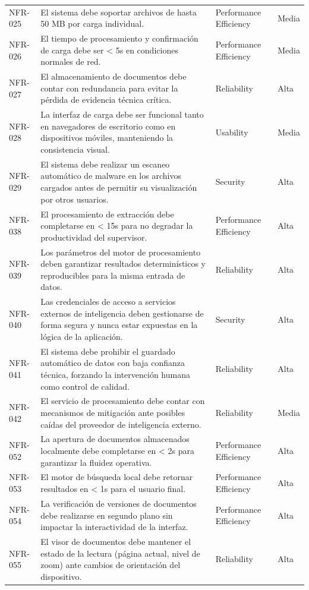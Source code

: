 \begin{longtable}{>{\raggedright\arraybackslash}p{} >{\raggedright\arraybackslash}p{} >{\raggedright\arraybackslash}p{} >{\raggedright\arraybackslash}p{}}
NFR-025 & El sistema debe soportar archivos de hasta 50 MB por carga individual. & Performance Efficiency & Media \\
NFR-026 & El tiempo de procesamiento y confirmación de carga debe ser < 5s en condiciones normales de red. & Performance Efficiency & Media \\
NFR-027 & El almacenamiento de documentos debe contar con redundancia para evitar la pérdida de evidencia técnica crítica. & Reliability & Alta \\
NFR-028 & La interfaz de carga debe ser funcional tanto en navegadores de escritorio como en dispositivos móviles, manteniendo la consistencia visual. & Usability & Media \\
NFR-029 & El sistema debe realizar un escaneo automático de malware en los archivos cargados antes de permitir su visualización por otros usuarios. & Security & Alta \\
NFR-038 & El procesamiento de extracción debe completarse en < 15s para no degradar la productividad del supervisor. & Performance Efficiency & Alta \\
NFR-039 & Los parámetros del motor de procesamiento deben garantizar resultados determinísticos y reproducibles para la misma entrada de datos. & Reliability & Alta \\
NFR-040 & Las credenciales de acceso a servicios externos de inteligencia deben gestionarse de forma segura y nunca estar expuestas en la lógica de la aplicación. & Security & Alta \\
NFR-041 & El sistema debe prohibir el guardado automático de datos con baja confianza técnica, forzando la intervención humana como control de calidad. & Reliability & Alta \\
NFR-042 & El servicio de procesamiento debe contar con mecanismos de mitigación ante posibles caídas del proveedor de inteligencia externo. & Reliability & Media \\
NFR-052 & La apertura de documentos almacenados localmente debe completarse en < 2s para garantizar la fluidez operativa. & Performance Efficiency & Alta \\
NFR-053 & El motor de búsqueda local debe retornar resultados en < 1s para el usuario final. & Performance Efficiency & Alta \\
NFR-054 & La verificación de versiones de documentos debe realizarse en segundo plano sin impactar la interactividad de la interfaz. & Performance Efficiency & Alta \\
NFR-055 & El visor de documentos debe mantener el estado de la lectura (página actual, nivel de zoom) ante cambios de orientación del dispositivo. & Reliability & Alta \\

\end{longtable}
